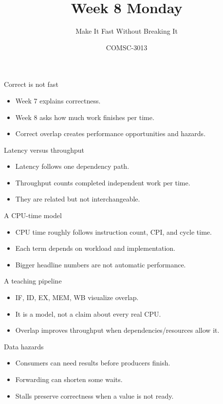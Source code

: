 \documentclass{beamer}
\title{Week 8 Monday}\subtitle{Make It Fast Without Breaking It}\author{COMSC-3013}\date{}
\begin{document}
\begin{frame}\titlepage\end{frame}
\begin{frame}{Correct is not fast}\begin{itemize}\item Week 7 explains correctness.\item Week 8 asks how much work finishes per time.\item Correct overlap creates performance opportunities and hazards.\end{itemize}\end{frame}
\begin{frame}{Latency versus throughput}\begin{itemize}\item Latency follows one dependency path.\item Throughput counts completed independent work per time.\item They are related but not interchangeable.\end{itemize}\end{frame}
\begin{frame}{A CPU-time model}\begin{itemize}\item CPU time roughly follows instruction count, CPI, and cycle time.\item Each term depends on workload and implementation.\item Bigger headline numbers are not automatic performance.\end{itemize}\end{frame}
\begin{frame}{A teaching pipeline}\begin{itemize}\item IF, ID, EX, MEM, WB visualize overlap.\item It is a model, not a claim about every real CPU.\item Overlap improves throughput when dependencies/resources allow it.\end{itemize}\end{frame}
\begin{frame}{Data hazards}\begin{itemize}\item Consumers can need results before producers finish.\item Forwarding can shorten some waits.\item Stalls preserve correctness when a value is not ready.\end{itemize}\end{frame}
\end{document}
